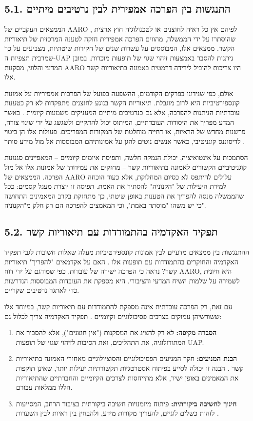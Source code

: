 \documentclass[12pt,a4paper]{article}
\begin{document}
\subsection{5.1. התנגשות בין הפרכה אמפירית לבין נרטיבים מיתיים}
הממצאים העקביים של AARO \cite{1, 2, 6}, לפיהם אין כל ראיה לחוצנים או לטכנולוגיה חוץ-ארצית שהוסתרו על ידי הממשלה, מהווים הפרכה אמפירית חזקה לטענה המרכזית של תיאוריות הקשר. ממצאים אלו, המבוססים על עשרות שנים של חקירות שיטתיות, מצביעים על כך שמרבית תצפיות ה-UAP ניתנות להסבר באמצעות זיהוי שגוי של תופעות מוכרות. במובן המדעי והלוגי, מסקנות AARO היו צריכות להוביל לירידה דרמטית באמונה בתיאוריות קשר אלו.

אולם, כפי שנידונו בפרקים הקודמים, ההשפעה בפועל של הפרכות אמפיריות על אמונות קונספירטיביות היא לרוב מוגבלת. תיאוריות הקשר בנוגע לחוצנים מתפקדות לא רק כטענות עובדתיות הניתנות להפרכה, אלא גם כנרטיבים מיתיים המעניקים משמעות קיומית \cite{3}. כאשר המדע מפריך את היסודות העובדתיים, המיתוס יכול להתקיים ולשגשג על ידי שינוי צורה, פרשנות מחדש של הראיות, או דחייה מוחלטת של המקורות המפריכים. פעולות אלו הן ביטוי לדיסוננס קוגניטיבי, כאשר אנשים נוטים להגן על אמונותיהם המבוססות אל מול מידע סותר \cite{4}.

הסתמכות על אינטואיציה, יכולת הנמקה חלשה, ותפיסת איומים קיומיים – המאפיינים סגנונות קוגניטיביים הקשורים לאמונה בתיאוריות קשר \cite{4} – מחזקים את עמידותן של אמונות אלו אל מול הפרכה. הממצאים של AARO עלולים להיתפס לא כסיום המחלוקת, אלא כעוד הוכחה למידת היעילות של "הקנוניה" להסתיר את האמת. תפיסה זו יוצרת מעגל קסמים: ככל שהממשלה מנסה להפריך את הטענות באופן שיטתי, כך מתחזקת בקרב המאמינים התחושה כי יש משהו "מוסתר באמת", וכי המאמצים להפרכה הם רק חלק מ"הקנוניה".

\subsection{5.2. תפקיד האקדמיה בהתמודדות עם תיאוריות קשר}
ההתנגשות בין ממצאים מדעיים לבין אמונות קונספירטיביות מעלה שאלות חשובות לגבי תפקיד האקדמיה והחוקרים בהתמודדות עם תופעות אלו \cite{2}. האם על אקדמאים "להפריך" תיאוריות קשר? נראה כי הפרכה ישירה של עובדות, כפי שמודגם על ידי דוח AARO, היא חיונית לשמירה על שלמות השיח המדעי והציבורי. היא מספקת את העובדות המבוססות הנדרשות כדי לאתגר נרטיבים שקריים.

עם זאת, רק הפרכה עובדתית אינה מספקת להתמודדות עם תיאוריות קשר, במיוחד אלו ששורשיהן עמוקים בצרכים פסיכולוגיים וקיומיים \cite{3}. תפקיד האקדמיה צריך לכלול גם:

\begin{enumerate}
    \item \textbf{הסברה מקיפה:} לא רק להציג את המסקנות ("אין חוצנים"), אלא להסביר את המתודולוגיה, את התהליכים, ואת הסיבות לזיהוי שגוי של תופעות UAP.
    \item \textbf{הבנת המניעים:} חקר המניעים הפסיכולוגיים והסוציולוגיים מאחורי האמונה בתיאוריות קשר \cite{3, 4}. הבנה זו יכולה לסייע בפיתוח אסטרטגיות תקשורתיות יעילות יותר, שאינן תוקפות את המאמינים באופן ישיר, אלא מתייחסות לצרכים הקיומיים והחברתיים שהתיאוריות הללו ממלאות עבורם.
    \item \textbf{חינוך לחשיבה ביקורתית:} פיתוח מיומנויות חשיבה ביקורתית בציבור הרחב, המסייעות לזהות כשלים לוגיים, להעריך מקורות מידע, ולהבחין בין ראיות לבין השערות \cite{4, 5}.
\end{enumerate}
\end{document}
